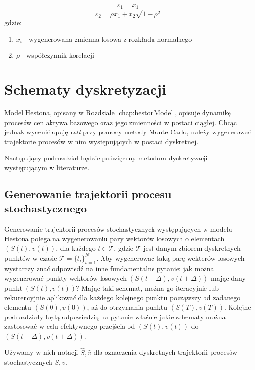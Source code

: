 \documentclass{pracamgr}
\begin{document}
\begin{equation}
  \varepsilon_1 = x_1
\end{equation}
\begin{equation}
  \varepsilon_2 = \rho x_1 + x_2 \sqrt{1-\rho^2}
\end{equation}
gdzie:
\begin{enumerate}
  \item $x_i$ - wygenerowana zmienna losowa z rozkładu normalnego
  \item $\rho$  - współczynnik korelacji
\end{enumerate}




\section{Schematy dyskretyzacji}


Model Hestona, opisany w Rozdziale \ref{chap:hestonModel}, opisuje dynamikę procesów cen aktywa 
bazowego oraz jego zmienności w postaci ciągłej.
Chcąc jednak wycenić opcję \textit{call} przy pomocy metody Monte Carlo, należy wygenerować 
trajektorie procesów w nim występujących w postaci dyskretnej. 

Następujący podrozdział będzie poświęcony metodom dyskretyzacji występującym w literaturze.

\subsection{Generowanie trajektorii procesu stochastycznego}
Generowanie trajektorii procesów stochastycznych występujących w modelu Hestona polega na
wygenerowaniu pary wektorów losowych o elementach $(S(t), v(t))$, dla każdego $t \in \mathscr{T}$, 
gdzie $\mathscr{T}$ jest danym zbiorem dyskretnych punktów w czasie 
$\mathscr{T}  = \{t_i\}^N_{t=1}$. Aby wygenerować taką parę wektorów losowych wystarczy znać 
odpowiedź na inne fundamentalne pytanie: jak można wygenerować punkty wektorów losowych 
$(S(t+ \Delta), v(t+ \Delta))$
mając dany punkt $(S(t), v(t))$? Mając taki schemat, można go iteracyjnie lub rekurencyjnie aplikować 
dla każdego kolejnego punktu począwszy od zadanego elementu $(S(0), v(0))$, 
aż do otrzymania punktu $(S(T), v(T))$.
Kolejne podrozdziały będą odpowiedzią na pytanie właśnie jakie schematy można zastosować w celu 
efektywnego przejścia od $(S(t), v(t))$ do $(S(t+ \Delta), v(t+ \Delta))$.

Używamy w nich notacji $\hat{S}, \hat{v}$ dla oznaczenia dyskretnych trajektorii procesów 
stochastycznych $S, v$.
\end{document}
